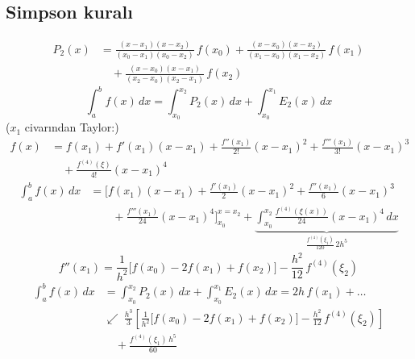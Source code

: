 \documentclass[11pt,a4paper]{article}
\begin{document}
\subsection{Simpson kuralı}
\begin{center}
\end{center}
\begin{align*}
  P_2(x) &= \frac{(x-x_1)(x-x_2)}{(x_0-x_1)(x_0-x_2)}\,f(x_0) + \frac{(x-x_0)(x-x_2)}{(x_1-x_0)(x_1-x_2)}\,f(x_1)\\
  &\quad + \frac{(x-x_0)(x-x_1)}{(x_2-x_0)(x_2-x_1)}\,f(x_2)
\end{align*}
\[
  \int_a^b f(x)\,dx = \int_{x_0}^{x_2} P_2(x)\,dx + \int_{x_0}^{x_1} E_2(x)\,dx
\]
{\small\color{kursunkalem}($x_1$ civarından Taylor:)}
\begin{align*}
  f(x) &= f(x_1) + f'(x_1)(x-x_1) + \frac{f''(x_1)}{2!}(x-x_1)^2 + \frac{f'''(x_1)}{3!}(x-x_1)^3\\
  &\quad + \frac{f^{(4)}(\xi)}{4!}(x-x_1)^4
\end{align*}
\begin{align*}
  \int_a^b f(x)\,dx &= \Big[f(x_1)(x-x_1) + \frac{f'(x_1)}{2}(x-x_1)^2 + \frac{f''(x_1)}{6}(x-x_1)^3\\
  &\qquad + \frac{f'''(x_1)}{24}(x-x_1)^4\Big]_{x_0}^{x=x_2}
   + \underbrace{\int_{x_0}^{x_2} \frac{f^{(4)}(\xi(x))}{24}(x-x_1)^4\,dx}_{\frac{f^{(4)}(\xi_1)}{120}\,2h^5}
\end{align*}
\[
  f''(x_1) = \frac{1}{h^2}\Big[f(x_0) - 2f(x_1) + f(x_2)\Big] - \frac{h^2}{12}\,f^{(4)}(\xi_2)
\]
\begin{align*}
  \int_a^b f(x)\,dx &= \int_{x_0}^{x_2} P_2(x)\,dx + \int_{x_0}^{x_1} E_2(x)\,dx = 2h\,f(x_1) + \ldots\\
  &\swarrow\ \frac{h^3}{3}\left[\frac{1}{h^2}\Big[f(x_0) - 2f(x_1) + f(x_2)\Big] - \frac{h^2}{12}\,f^{(4)}(\xi_2)\right]\\
  &\quad + \frac{f^{(4)}(\xi_1)\,h^5}{60}
\end{align*}
\end{document}
